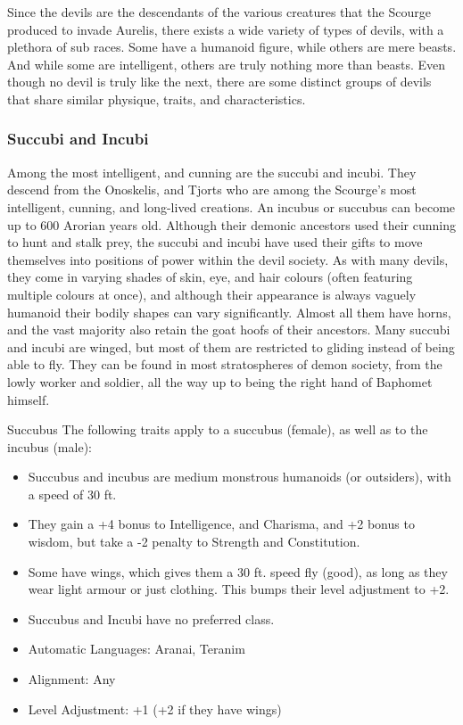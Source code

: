 Since the devils are the descendants of the various creatures that the Scourge
produced to invade Aurelis, there exists a wide variety of types of devils,
with a plethora of sub races. Some have a humanoid figure, while others are
mere beasts. And while some are intelligent, others are truly nothing more
than beasts. Even though no devil is truly like the next, there are some
distinct groups of devils that share similar physique, traits, and
characteristics.

\subsubsection{Succubi and Incubi}

Among the most intelligent, and cunning are the succubi and incubi. They
descend from the Onoskelis, and Tjorts who are among the Scourge's most
intelligent, cunning, and long-lived creations. An incubus or succubus can
become up to 600 Arorian years old. Although their demonic ancestors used
their cunning to hunt and stalk prey, the succubi and incubi have used their
gifts to move themselves into positions of power within the devil society.  As
with many devils, they come in varying shades of skin, eye, and hair colours
(often featuring multiple colours at once), and although their appearance is
always vaguely humanoid their bodily shapes can vary significantly. Almost all
them have horns, and the vast majority also retain the goat hoofs of their
ancestors. Many succubi and incubi are winged, but most of them are restricted
to gliding instead of being able to fly. They can be found in most
stratospheres of demon society, from the lowly worker and soldier, all the way
up to being the right hand of Baphomet himself.

\begin{35e}{Succubus}
  The following traits apply to a succubus (female), as well as to the incubus
  (male):
  \begin{itemize}[noitemsep]
  \item Succubus and incubus are medium monstrous humanoids (or outsiders), with
    a speed of 30 ft.
  \item They gain a +4 bonus to Intelligence, and Charisma, and +2 bonus to
    wisdom, but take a -2 penalty to Strength and Constitution.
  \item Some have wings, which gives them a 30 ft. speed fly (good), as long
    as they wear light armour or just clothing. This bumps their level adjustment
    to +2.
  \item Succubus and Incubi have no preferred class.
  \item Automatic Languages: Aranai, Teranim
  \item Alignment: Any
  \item Level Adjustment: +1 (+2 if they have wings)
  \end{itemize}
\end{35e}

